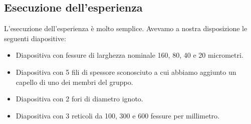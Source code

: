 \subsection{Esecuzione dell'esperienza}

L'esecuzione dell'esperienza è molto semplice. Avevamo a nostra disposizione le seguenti diapositive:

\begin{itemize}
    \item{Diapositiva con fessure di larghezza nominale 160, 80, 40 e 20 micrometri.}
    \item{Diapositiva con 5 fili di spessore sconosciuto a cui abbiamo aggiunto un capello di uno dei membri del gruppo.}
    \item{Diapositiva con 2 fori di diametro ignoto.}
    \item{Diapositiva con 3 reticoli da 100, 300 e 600 fessure per millimetro.}
\end{itemize}

